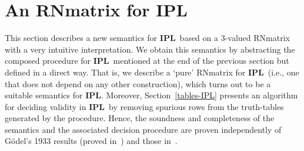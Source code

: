 \documentclass[12pt]{article}
\newtheorem{definition}[theorem]{Definition}
\newcommand{\ipl}{\ensuremath{\mathbf{IPL}}}
\begin{document}




\section{An RNmatrix  for \ipl} \label{RNmatrix-IPL}


This section describes a new semantics for \ipl\ based on a 3-valued RNmatrix with a very intuitive interpretation. We obtain this semantics by abstracting the composed procedure for \ipl\ mentioned at the end of the previous section but defined in a direct way. 
That is, we describe a `pure' RNmatrix for \ipl\ (i.e., one that does not depend on any other construction), which turns out to be a suitable semantics for \ipl. Moreover, Section~\ref{tables-IPL} presents an algorithm for deciding validity in \ipl\ by removing spurious rows from the truth-tables generated by the procedure. Hence, the soundness and completeness of the semantics and the associated decision procedure are proven independently of G\"odel's 1933 results (proved in~\cite{McKinsey:Tarsk:48}) and those in~\cite{gratz_truth_2022}.


\end{document}
